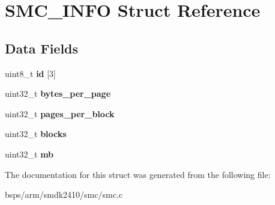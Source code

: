\hypertarget{structSMC__INFO}{}\section{S\+M\+C\+\_\+\+I\+N\+FO Struct Reference}
\label{structSMC__INFO}
\subsection*{Data Fields}
\begin{DoxyCompactItemize}
\item 
\mbox{\label{structSMC__INFO_ac8710c12ae46b4f19aee110283378f03}} 
uint8\+\_\+t {\bfseries id} \mbox{[}3\mbox{]}
\item 
\mbox{\label{structSMC__INFO_a702657f9fcca17e93f565062d9bbe6dc}} 
uint32\+\_\+t {\bfseries bytes\+\_\+per\+\_\+page}
\item 
\mbox{\label{structSMC__INFO_a694dd75d95c361a13fcfc6a6dda06526}} 
uint32\+\_\+t {\bfseries pages\+\_\+per\+\_\+block}
\item 
\mbox{\label{structSMC__INFO_a2110f07c96d66d3341ec510cbb6cda48}} 
uint32\+\_\+t {\bfseries blocks}
\item 
\mbox{\label{structSMC__INFO_afef5f941b0e49b00d4668bf3da3fec92}} 
uint32\+\_\+t {\bfseries mb}
\end{DoxyCompactItemize}


The documentation for this struct was generated from the following file\+:\begin{DoxyCompactItemize}
\item 
bsps/arm/smdk2410/smc/smc.\+c\end{DoxyCompactItemize}
